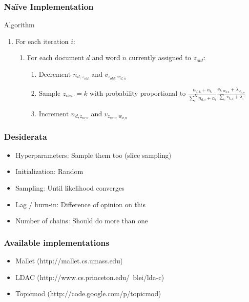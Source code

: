 \begin{frame}

\frametitle{Na\"ive Implementation}

\begin{block}{Algorithm}
\begin{enumerate}
\item For each iteration $i$:
\begin{enumerate}
\item For each document $d$ and word $n$ currently assigned to $z_{old}$:
\begin{enumerate}
\item Decrement $n_{d,z_{old}}$ and $v_{z_{old}, w_{d,n}}$
\item Sample $z_{new} = k$ with probability proportional to $\frac{n_{d, k} + \alpha_k}{ \sum_{i}^{K} { n_{d,i} + \alpha_i}} \frac{v_{k, w_{d,n}} + \lambda_{w_{d,n}}}{ \sum_{i} { v_{k,i} + \lambda_{i}}}$
\item Increment $n_{d,z_{new}}$ and $v_{z_{new}, w_{d,n}}$
\end{enumerate}
\end{enumerate}
\end{enumerate}
\end{block}

\end{frame}

\iflong
\begin{frame}
\frametitle{Desiderata}
\begin{itemize}
\item Hyperparameters: Sample them too (slice sampling)
\item Initialization: Random
\item Sampling: Until likelihood converges
\item Lag / burn-in: Difference of opinion on this
\item Number of chains: Should do more than one
\end{itemize}
\end{frame}


\begin{frame}
	\frametitle{Available implementations}

	\begin{itemize}
		\item Mallet (http://mallet.cs.umass.edu)
		\item LDAC (http://www.cs.princeton.edu/~blei/lda-c)
		\item Topicmod (http://code.google.com/p/topicmod)
	\end{itemize}
\end{frame}
\fi